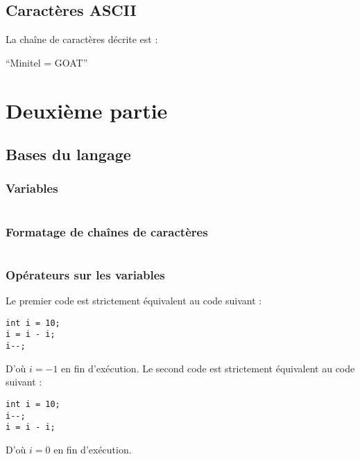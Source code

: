 \documentclass[../main.tex]{subfiles}
\begin{document}
\subsection{Caractères ASCII}
 La chaîne de caractères décrite est : 
\begin{center}
``Minitel = GOAT''
\end{center}
\section{Deuxième partie}
\subsection{Bases du langage}
\subsubsection{Variables}
\inputminted{c}{solutions/inter_var_side_effect.c}
\subsubsection{Formatage de chaînes de caractères}
\inputminted{c}{solutions/taille_types.c}
\subsubsection{Opérateurs sur les variables}
 
Le premier code est strictement équivalent au code suivant :
\begin{verbatim}
int i = 10;
i = i - i;
i--;
\end{verbatim}
D'où $i = -1$ en fin d'exécution. 
Le second code est strictement équivalent au code suivant :
\begin{verbatim}
int i = 10;
i--;
i = i - i;
\end{verbatim}
D'où $i = 0$ en fin d'exécution.
 
\end{document}
